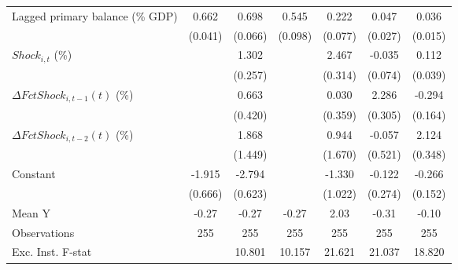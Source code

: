 {\begin{tabular}{l*{6}{c}}
\addlinespace
Lagged primary balance (\% GDP)&       0.662\sym{***}&       0.698\sym{***}&       0.545\sym{***}&       0.222\sym{**} &       0.047         &       0.036\sym{**} \\
                    &     (0.041)         &     (0.066)         &     (0.098)         &     (0.077)         &     (0.027)         &     (0.015)         \\
\addlinespace
$ Shock_{i,t}$ (\%) &                     &       1.302\sym{***}&                     &       2.467\sym{***}&      -0.035         &       0.112\sym{**} \\
                    &                     &     (0.257)         &                     &     (0.314)         &     (0.074)         &     (0.039)         \\
\addlinespace
$ \Delta FctShock_{i,t-1}(t)$ (\%)&                     &       0.663         &                     &       0.030         &       2.286\sym{***}&      -0.294\sym{*}  \\
                    &                     &     (0.420)         &                     &     (0.359)         &     (0.305)         &     (0.164)         \\
\addlinespace
$ \Delta FctShock_{i,t-2}(t)$ (\%)&                     &       1.868         &                     &       0.944         &      -0.057         &       2.124\sym{***}\\
                    &                     &     (1.449)         &                     &     (1.670)         &     (0.521)         &     (0.348)         \\
\addlinespace
Constant            &      -1.915\sym{**} &      -2.794\sym{***}&                     &      -1.330         &      -0.122         &      -0.266         \\
                    &     (0.666)         &     (0.623)         &                     &     (1.022)         &     (0.274)         &     (0.152)         \\
\midrule
Mean Y              &       -0.27         &       -0.27         &       -0.27         &        2.03         &       -0.31         &       -0.10         \\
Observations        &         255         &         255         &         255         &         255         &         255         &         255         \\
Exc. Inst. F-stat   &                     &      10.801         &      10.157         &      21.621         &      21.037         &      18.820         \\
\bottomrule
\end{tabular}
}
